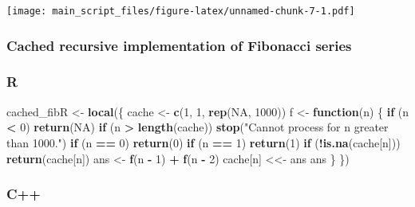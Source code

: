 \documentclass[]{article}
\newenvironment{Shaded}{\begin{snugshade}}{\end{snugshade}}
\newcommand{\KeywordTok}[1]{\textcolor[rgb]{0.13,0.29,0.53}{\textbf{#1}}}
\newcommand{\DecValTok}[1]{\textcolor[rgb]{0.00,0.00,0.81}{#1}}
\newcommand{\StringTok}[1]{\textcolor[rgb]{0.31,0.60,0.02}{#1}}
\newcommand{\OtherTok}[1]{\textcolor[rgb]{0.56,0.35,0.01}{#1}}
\newcommand{\ControlFlowTok}[1]{\textcolor[rgb]{0.13,0.29,0.53}{\textbf{#1}}}
\newcommand{\OperatorTok}[1]{\textcolor[rgb]{0.81,0.36,0.00}{\textbf{#1}}}
\newcommand{\NormalTok}[1]{#1}
\begin{document}
\texttt{[image: main\_script\_files/figure-latex/unnamed-chunk-7-1.pdf]}

\newpage

\subsubsection{Cached recursive implementation of Fibonacci
series}\label{cached-recursive-implementation-of-fibonacci-series}

\subsubsection{R}\label{r-1}

\begin{Shaded}
\begin{Highlighting}[]
\NormalTok{cached_fibR <-}\StringTok{ }\KeywordTok{local}\NormalTok{(\{}
\NormalTok{  cache <-}\StringTok{ }\KeywordTok{c}\NormalTok{(}\DecValTok{1}\NormalTok{, }\DecValTok{1}\NormalTok{, }\KeywordTok{rep}\NormalTok{(}\OtherTok{NA}\NormalTok{, }\DecValTok{1000}\NormalTok{))}
\NormalTok{  f <-}\StringTok{ }\ControlFlowTok{function}\NormalTok{(n) \{}
    \ControlFlowTok{if}\NormalTok{ (n }\OperatorTok{<}\StringTok{ }\DecValTok{0}\NormalTok{) }\KeywordTok{return}\NormalTok{(}\OtherTok{NA}\NormalTok{)}
    \ControlFlowTok{if}\NormalTok{ (n }\OperatorTok{>}\StringTok{ }\KeywordTok{length}\NormalTok{(cache)) }\KeywordTok{stop}\NormalTok{(}\StringTok{"Cannot process for n greater than 1000."}\NormalTok{)}
    \ControlFlowTok{if}\NormalTok{ (n }\OperatorTok{==}\StringTok{ }\DecValTok{0}\NormalTok{) }\KeywordTok{return}\NormalTok{(}\DecValTok{0}\NormalTok{)}
    \ControlFlowTok{if}\NormalTok{ (n }\OperatorTok{==}\StringTok{ }\DecValTok{1}\NormalTok{) }\KeywordTok{return}\NormalTok{(}\DecValTok{1}\NormalTok{)}
    \ControlFlowTok{if}\NormalTok{ (}\OperatorTok{!}\KeywordTok{is.na}\NormalTok{(cache[n])) }\KeywordTok{return}\NormalTok{(cache[n])}
\NormalTok{    ans <-}\StringTok{ }\KeywordTok{f}\NormalTok{(n }\OperatorTok{-}\StringTok{ }\DecValTok{1}\NormalTok{) }\OperatorTok{+}\StringTok{ }\KeywordTok{f}\NormalTok{(n }\OperatorTok{-}\StringTok{ }\DecValTok{2}\NormalTok{)}
\NormalTok{    cache[n] <<-}\StringTok{ }\NormalTok{ans}
\NormalTok{    ans}
\NormalTok{  \}}
\NormalTok{\})}
\end{Highlighting}
\end{Shaded}

\newpage

\subsubsection{C++}\label{c-1}
\end{document}
